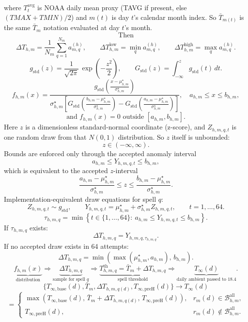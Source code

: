 \documentclass[11pt]{article}
\begin{document}
where \(T^{\mathrm{avg}}_t\) is NOAA daily mean proxy (TAVG if present, else \((TMAX+TMIN)/2\)) and \(m(t)\) is day \(t\)'s calendar month index. So \(\bar T_{m(t)}\) is the same \(\bar T_m\) notation evaluated at day \(t\)'s month.
\[
\text{Then}
\]
\[
\Delta T_{h,m}=\frac{1}{N_m}\sum_{q=1}^{N_m}a^{(h)}_{m,q},\qquad
\Delta T_{h,m}^{\mathrm{low}}=\min_q a^{(h)}_{m,q},\qquad
\Delta T_{h,m}^{\mathrm{high}}=\max_q a^{(h)}_{m,q}.
\]
\[
g_{\mathrm{std}}(z)=\frac{1}{\sqrt{2\pi}}\,\exp\!\left(-\frac{z^2}{2}\right),
\qquad
G_{\mathrm{std}}(z)=\int_{-\infty}^{z} g_{\mathrm{std}}(t)\,dt.
\]
\[
f_{h,m}(x)=
\frac{
g_{\mathrm{std}}\!\left(\frac{x-\mu_{h,m}^{\star}}{\sigma_{h,m}^{\star}}\right)
}{
\sigma_{h,m}^{\star}
\left[
G_{\mathrm{std}}\!\left(\frac{b_{h,m}-\mu_{h,m}^{\star}}{\sigma_{h,m}^{\star}}\right)
-G_{\mathrm{std}}\!\left(\frac{a_{h,m}-\mu_{h,m}^{\star}}{\sigma_{h,m}^{\star}}\right)
\right]
},
\quad
a_{h,m}\le x\le b_{h,m},
\]
\[
\text{and }f_{h,m}(x)=0\text{ outside }[a_{h,m},b_{h,m}].
\]
Here \(z\) is a dimensionless standard-normal coordinate (z-score), and \(Z_{h,m,q,t}\) is one random draw from that \(N(0,1)\) distribution.
So \(z\) itself is unbounded:
\[
z\in(-\infty,\infty).
\]
Bounds are enforced only through the accepted anomaly interval
\[
a_{h,m}\le Y_{h,m,q,t}\le b_{h,m},
\]
which is equivalent to the accepted \(z\)-interval
\[
\frac{a_{h,m}-\mu_{h,m}^{\star}}{\sigma_{h,m}^{\star}}
\le z \le
\frac{b_{h,m}-\mu_{h,m}^{\star}}{\sigma_{h,m}^{\star}}.
\]
Implementation-equivalent draw equations for spell \(q\):
\[
Z_{h,m,q,t}\sim g_{\mathrm{std}},\qquad
Y_{h,m,q,t}=\mu_{h,m}^{\star}+\sigma_{h,m}^{\star}Z_{h,m,q,t},\qquad t=1,\dots,64.
\]
\[
\tau_{h,m,q}=\min\left\{t\in\{1,\dots,64\}:\ a_{h,m}\le Y_{h,m,q,t}\le b_{h,m}\right\}.
\]
If \(\tau_{h,m,q}\) exists:
\[
\Delta T_{h,m,q}=Y_{h,m,q,\tau_{h,m,q}}.
\]
If no accepted draw exists in 64 attempts:
\[
\Delta T_{h,m,q}=\min\!\left(\max\!\left(\mu_{h,m}^{\star},a_{h,m}\right),\,b_{h,m}\right).
\]
\[
\underbrace{f_{h,m}(x)}_{\text{distribution}}
\Rightarrow
\underbrace{\Delta T_{h,m,q}}_{\text{sample for spell }q}
\Rightarrow
\underbrace{T_{h,m,q}^{\mathrm{th}}=\bar T_m+\Delta T_{h,m,q}}_{\text{spell threshold}}
\Rightarrow
\underbrace{T_{\infty}(d)}_{\text{daily ambient passed to 18.4}}.
\]
\[
\{T_{\infty,\mathrm{base}}(d),\bar T_m,\Delta T_{h,m,q(d)},T_{\infty,\mathrm{preH}}(d)\}
\rightarrow
T_{\infty}(d)
\]
\[
=
\begin{cases}
\max\!\left(T_{\infty,\mathrm{base}}(d),\,\bar T_m+\Delta T_{h,m,q(d)},\,T_{\infty,\mathrm{preH}}(d)\right), & r_m(d)\in\mathcal{B}_{h,m}^{\mathrm{all}},\\
T_{\infty,\mathrm{preH}}(d), & r_m(d)\notin\mathcal{B}_{h,m}^{\mathrm{all}}.
\end{cases}
\]
\end{document}
